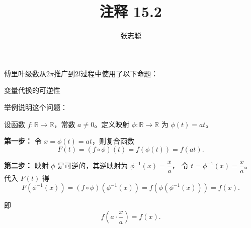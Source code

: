 \documentclass{article}
\begin{document}
\title{注释 15.2}
\author{张志聪}
\maketitle

\begin{zremark}
  傅里叶级数从$2\pi$推广到$2l$过程中使用了以下命题：

  变量代换的可逆性
\end{zremark}

举例说明这个问题：

设函数 $f: \mathbb{R} \to \mathbb{R}$，常数 $a \neq 0$。定义映射 $\phi: \mathbb{R} \to \mathbb{R}$ 为 $\phi(t) = a t$。

\noindent\textbf{第一步：} 令 $x = \phi(t) = a t$，则复合函数
\[
  F(t) = (f \circ \phi)(t) = f(\phi(t)) = f(a t).
\]

\noindent\textbf{第二步：} 映射 $\phi$ 是可逆的，其逆映射为 $\phi^{-1}(x) = \dfrac{x}{a}$，
令 $t = \phi^{-1}(x) = \dfrac{x}{a}$。代入 $F(t)$ 得
\[
  F(\phi^{-1}(x)) = (f \circ \phi)(\phi^{-1}(x)) = f(\phi(\phi^{-1}(x))) = f(x).
\]

即
\[
  f\left( a \cdot \frac{x}{a} \right) = f(x).
\]
\end{document}
